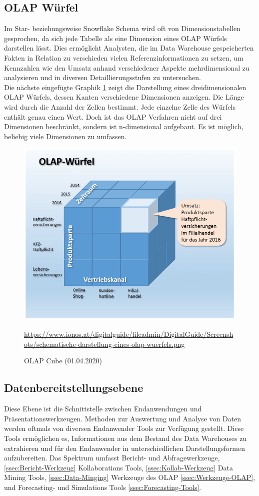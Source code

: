 \subsection{OLAP Würfel}\label{ssec:Olap-Cube}
Im Star- beziehungsweise Snowflake Schema wird oft von Dimensionstabellen gesprochen, da sich jede Tabelle als eine Dimension eines OLAP Würfels darstellen lässt. Dies ermöglicht Analysten, die im Data Warehouse gespeicherten Fakten in Relation zu verschieden vielen Referenzinformationen zu setzen, um Kennzahlen wie den Umsatz anhand verschiedener Aspekte mehrdimensional zu analysieren und in diversen Detaillierungsstufen zu untersuchen.\\ 
Die nächste eingefügte Graphik \ref{fig:OLAP-Cube} zeigt die Darstellung eines dreidimensionalen OLAP Würfels, dessen Kanten verschiedene Dimensionen anzeigen. Die Länge wird durch die Anzahl der Zellen bestimmt. Jede einzelne Zelle des Würfels enthält genau einen Wert. Doch ist das OLAP Verfahren nicht auf drei Dimensionen beschränkt, sondern ist n-dimensional aufgebaut. Es ist möglich, beliebig viele Dimensionen zu umfassen.
\begin{figure}[H]
\centering
  \includegraphics[scale=0.5]{images/OLAP.png}
  \caption[OLAP Cube (01.04.2020)]{OLAP Cube (01.04.2020)}
  \url{https://www.ionos.at/digitalguide/fileadmin/DigitalGuide/Screenshots/schematische-darstellung-eines-olap-wuerfels.png}
  \label{fig:OLAP-Cube}
\end{figure}
\newpage
\subsection{Datenbereitstellungsebene}
Diese Ebene ist die Schnittstelle zwischen Endanwendungen und Präsentationswerkzeugen. Methoden zur Auswertung und Analyse von Daten werden oftmals von diversen Endanwender Tools zur Verfügung gestellt. Diese Tools ermöglichen es, Informationen aus dem Bestand des Data Warehouses zu extrahieren und für den Endanwender in unterschiedlichen Darstellungsformen aufzubereiten. Das Spektrum umfasst Bericht- und Abfragewerkzeuge, \ref{ssec:Bericht-Werkzeug} Kollaborations Tools, \ref{ssec:Kollab-Werkzeug} Data Mining Tools, \ref{ssec:Data-Minging} Werkzeuge des OLAP \ref{ssec:Werkzeuge-OLAP}, und Forecasting- und Simulations Tools \ref{ssec:Forecasting-Tools}.

